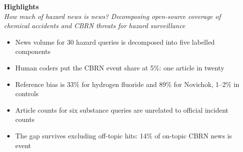 \documentclass[11pt]{article}
\begin{document}
\pagestyle{empty}
\begin{center}
{\large\bfseries Highlights}\\[4pt]
{\itshape How much of hazard news is news? Decomposing open-source coverage of chemical accidents and CBRN threats for hazard surveillance}
\end{center}
\vspace{1em}
\begin{itemize}[leftmargin=1.5em,itemsep=4pt]
\item News volume for 30 hazard queries is decomposed into five labelled components
\item Human coders put the CBRN event share at 5\%: one article in twenty
\item Reference bias is 33\% for hydrogen fluoride and 89\% for Novichok, 1--2\% in controls
\item Article counts for six substance queries are unrelated to official incident counts
\item The gap survives excluding off-topic hits: 14\% of on-topic CBRN news is event
\end{itemize}
\end{document}
